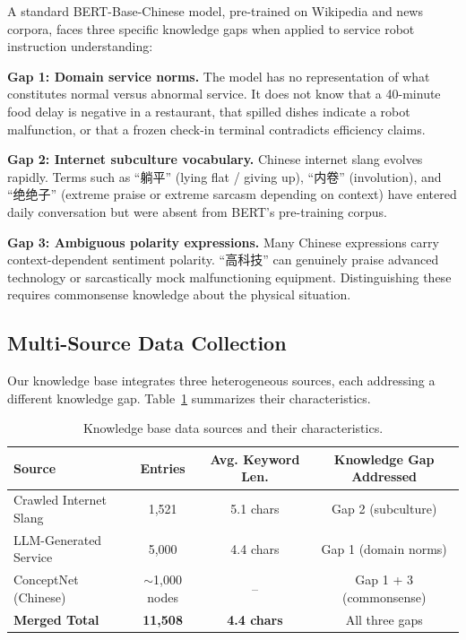 \documentclass[conference]{IEEEtran}
\begin{document}
A standard BERT-Base-Chinese model, pre-trained on Wikipedia and news corpora,
faces three specific knowledge gaps when applied to service robot instruction
understanding:

\textbf{Gap 1: Domain service norms.} The model has no representation of what
constitutes normal versus abnormal service. It does not know that a 40-minute
food delay is negative in a restaurant, that spilled dishes indicate a robot
malfunction, or that a frozen check-in terminal contradicts efficiency claims.

\textbf{Gap 2: Internet subculture vocabulary.} Chinese internet slang evolves
rapidly. Terms such as ``躺平'' (lying flat / giving up), ``内卷'' (involution),
and ``绝绝子'' (extreme praise or extreme sarcasm depending on context) have
entered daily conversation but were absent from BERT's pre-training corpus.

\textbf{Gap 3: Ambiguous polarity expressions.} Many Chinese expressions carry
context-dependent sentiment polarity. ``高科技'' can genuinely praise advanced
technology or sarcastically mock malfunctioning equipment.
Distinguishing these requires commonsense knowledge about the physical situation.

\subsection{Multi-Source Data Collection}

Our knowledge base integrates three heterogeneous sources, each addressing a
different knowledge gap. Table~\ref{tab:sources} summarizes their characteristics.

\begin{table}[H]
\centering
\caption{Knowledge base data sources and their characteristics.}
\label{tab:sources}
\begin{tabular}{lccc}
\toprule
\textbf{Source} & \textbf{Entries} & \textbf{Avg. Keyword Len.} & \textbf{Knowledge Gap Addressed} \\
\midrule
Crawled Internet Slang  & 1,521  & 5.1 chars & Gap 2 (subculture) \\
LLM-Generated Service   & 5,000  & 4.4 chars & Gap 1 (domain norms) \\
ConceptNet (Chinese)    & $\sim$1,000 nodes & -- & Gap 1 + 3 (commonsense) \\
\midrule
\textbf{Merged Total}   & \textbf{11,508} & \textbf{4.4 chars} & All three gaps \\
\bottomrule
\end{tabular}
\end{table}
\end{document}
